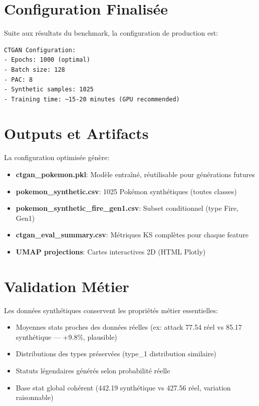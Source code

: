 \documentclass[11pt,a4paper]{article}
\begin{document}
\section{Configuration Finalisée}

Suite aux résultats du benchmark, la configuration de production est:

\begin{verbatim}
CTGAN Configuration:
- Epochs: 1000 (optimal)
- Batch size: 128
- PAC: 8
- Synthetic samples: 1025
- Training time: ~15-20 minutes (GPU recommended)
\end{verbatim}

\section{Outputs et Artifacts}

La configuration optimisée génère:

\begin{itemize}
    \item \textbf{ctgan\_pokemon.pkl}: Modèle entraîné, réutilisable pour générations futures
    \item \textbf{pokemon\_synthetic.csv}: 1025 Pokémon synthétiques (toutes classes)
    \item \textbf{pokemon\_synthetic\_fire\_gen1.csv}: Subset conditionnel (type Fire, Gen1)
    \item \textbf{ctgan\_eval\_summary.csv}: Métriques KS complètes pour chaque feature
    \item \textbf{UMAP projections}: Cartes interactives 2D (HTML Plotly)
\end{itemize}

\section{Validation Métier}

Les données synthétiques conservent les propriétés métier essentielles:

\begin{itemize}
    \item Moyennes stats proches des données réelles (ex: attack 77.54 réel vs 85.17 synthétique — +9.8\%, plausible)
    \item Distributions des types préservées (type\_1 distribution similaire)
    \item Statuts légendaires générés selon probabilité réelle
    \item Base stat global cohérent (442.19 synthétique vs 427.56 réel, variation raisonnable)
\end{itemize}
\end{document}
